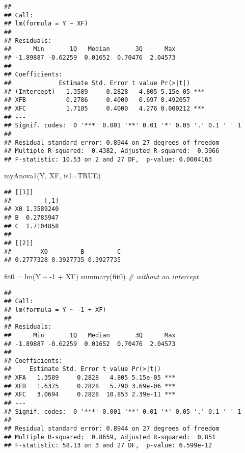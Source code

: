 \documentclass[
  11pt,
]{article}
\newenvironment{Shaded}{\begin{snugshade}}{\end{snugshade}}
\newcommand{\AttributeTok}[1]{\textcolor[rgb]{0.77,0.63,0.00}{#1}}
\newcommand{\CommentTok}[1]{\textcolor[rgb]{0.56,0.35,0.01}{\textit{#1}}}
\newcommand{\ConstantTok}[1]{\textcolor[rgb]{0.00,0.00,0.00}{#1}}
\newcommand{\DecValTok}[1]{\textcolor[rgb]{0.00,0.00,0.81}{#1}}
\newcommand{\FunctionTok}[1]{\textcolor[rgb]{0.00,0.00,0.00}{#1}}
\newcommand{\NormalTok}[1]{#1}
\newcommand{\OtherTok}[1]{\textcolor[rgb]{0.56,0.35,0.01}{#1}}
\newcommand{\SpecialCharTok}[1]{\textcolor[rgb]{0.00,0.00,0.00}{#1}}
\begin{document}
\begin{verbatim}
## 
## Call:
## lm(formula = Y ~ XF)
## 
## Residuals:
##      Min       1Q   Median       3Q      Max 
## -1.89887 -0.62259  0.01652  0.70476  2.04573 
## 
## Coefficients:
##             Estimate Std. Error t value Pr(>|t|)    
## (Intercept)   1.3589     0.2828   4.805 5.15e-05 ***
## XFB           0.2786     0.4000   0.697 0.492057    
## XFC           1.7105     0.4000   4.276 0.000212 ***
## ---
## Signif. codes:  0 '***' 0.001 '**' 0.01 '*' 0.05 '.' 0.1 ' ' 1
## 
## Residual standard error: 0.8944 on 27 degrees of freedom
## Multiple R-squared:  0.4382, Adjusted R-squared:  0.3966 
## F-statistic: 10.53 on 2 and 27 DF,  p-value: 0.0004163
\end{verbatim}

\begin{Shaded}
\begin{Highlighting}[]
\FunctionTok{myAnova1}\NormalTok{(Y, XF, }\AttributeTok{is1=}\ConstantTok{TRUE}\NormalTok{)}
\end{Highlighting}
\end{Shaded}

\begin{verbatim}
## [[1]]
##         [,1]
## X0 1.3589240
## B  0.2785947
## C  1.7104858
## 
## [[2]]
##        X0         B         C 
## 0.2777328 0.3927735 0.3927735
\end{verbatim}

\begin{Shaded}
\begin{Highlighting}[]
\NormalTok{fit0 }\OtherTok{=} \FunctionTok{lm}\NormalTok{(Y }\SpecialCharTok{\textasciitilde{}} \SpecialCharTok{{-}}\DecValTok{1} \SpecialCharTok{+}\NormalTok{ XF)}
\FunctionTok{summary}\NormalTok{(fit0) }\CommentTok{\# without an intercept}
\end{Highlighting}
\end{Shaded}

\begin{verbatim}
## 
## Call:
## lm(formula = Y ~ -1 + XF)
## 
## Residuals:
##      Min       1Q   Median       3Q      Max 
## -1.89887 -0.62259  0.01652  0.70476  2.04573 
## 
## Coefficients:
##     Estimate Std. Error t value Pr(>|t|)    
## XFA   1.3589     0.2828   4.805 5.15e-05 ***
## XFB   1.6375     0.2828   5.790 3.69e-06 ***
## XFC   3.0694     0.2828  10.853 2.39e-11 ***
## ---
## Signif. codes:  0 '***' 0.001 '**' 0.01 '*' 0.05 '.' 0.1 ' ' 1
## 
## Residual standard error: 0.8944 on 27 degrees of freedom
## Multiple R-squared:  0.8659, Adjusted R-squared:  0.851 
## F-statistic: 58.13 on 3 and 27 DF,  p-value: 6.599e-12
\end{verbatim}
\end{document}
